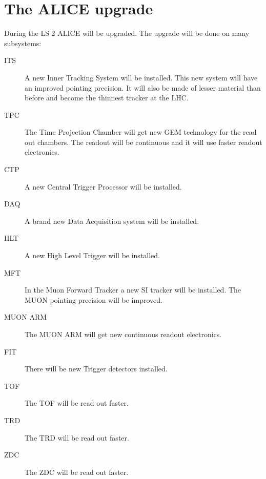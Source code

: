 \section{The ALICE upgrade}
During the LS 2 ALICE will be upgraded. The upgrade will be done on many subsystems:
\begin{description}
  \item[ITS] A new Inner Tracking System will be installed. This new system will have an improved pointing precision. It will also be made of lesser material than before and become the thinnest tracker at the LHC.
  \item[TPC] The Time Projection Chamber will get new GEM technology for the read out chambers. The readout will be continuous and it will use faster readout electronics.
  \item[CTP] A new Central Trigger Processor will be installed.
  \item[DAQ] A brand new Data Acquisition system will be installed.
  \item[HLT] A new High Level Trigger will be installed.
  \item[MFT] In the Muon Forward Tracker a new SI tracker will be installed. The MUON pointing precision will be improved.
  \item[MUON ARM] The MUON ARM will get new continuous readout electronics.
  \item[FIT] There will be new Trigger detectors installed.
  \item[TOF] The TOF will be read out faster.
  \item[TRD] The TRD will be read out faster.
  \item[ZDC] The ZDC will be read out faster.
\end{description}

